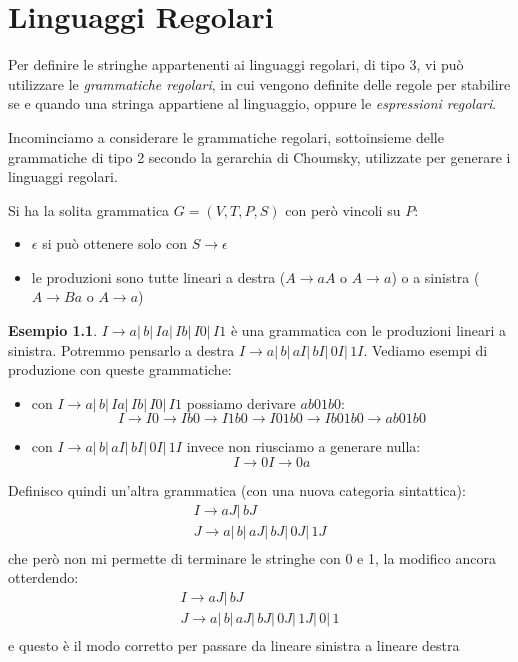 \documentclass[a4paper]{book}
\theoremstyle{definition}%
\newtheorem*{esempio}{Esempio}
\begin{document}
\chapter{Linguaggi Regolari}
Per definire le stringhe appartenenti ai linguaggi regolari, di tipo 3, vi può utilizzare le \emph{grammatiche regolari},
in cui vengono definite delle regole per stabilire se e quando una stringa appartiene al linguaggio, oppure le \emph{espressioni regolari}.

Incominciamo a considerare le grammatiche regolari, sottoinsieme delle grammatiche di tipo 2 secondo la gerarchia di Choumsky,
utilizzate per generare i linguaggi regolari.

Si ha la solita grammatica $G = (V, T, P, S)$ con però vincoli su $P$:
\begin{itemize}
  \item $\epsilon$ si può ottenere solo con $S\to \epsilon$
  \item le produzioni sono tutte lineari a destra ($A\to aA$ o $A\to a$) o a sinistra ($A\to Ba$ o $A\to a$)
\end{itemize}
\begin{esempio}
$I\to a|\,b|\,Ia|\,Ib|\,I0|\,I1$ è una grammatica con le produzioni lineari a sinistra.\newline
Potremmo pensarlo a destra $I\to a|\,b|\,aI|\,bI|\,0I|\,1I$.\newline
Vediamo esempi di produzione con queste grammatiche:
\begin{itemize}
\item con $I\to a|\,b|\,Ia|\,Ib|\,I0|\,I1$ possiamo derivare $ab01b0$:
\[ I\to I0\to Ib0\to I1b0\to I01b0\to Ib01b0\to ab01b0 \]
\item con $I\to a|\,b|\,aI|\,bI|\,0I|\,1I$ invece non riusciamo a generare nulla:
\[ I\to 0I\to 0a \]
\end{itemize}
Definisco quindi un'altra grammatica (con una nuova categoria sintattica):
\[ \begin{aligned}
  I\to aJ|\, bJ \\
  J\to a|\,b|\,aJ|\,bJ|\,0J|\,1J\\
  \end{aligned} \]
che però non mi permette di terminare le stringhe con 0 e 1, la modifico ancora otterdendo:
\[ \begin{aligned}
  I\to aJ|\, bJ\\
  J\to a|\,b|\,aJ|\,bJ|\,0J|\,1J|\,0|\,1\\
  \end{aligned} \]
e questo è il modo corretto per passare da lineare sinistra a lineare destra
\end{esempio}
\end{document}
